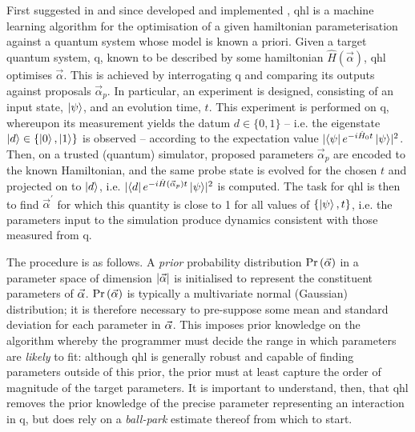 
First suggested in \cite{Granade:2012kj} and since developed \cite{wiebe2014qhlpra, Wiebe:2014qhl} 
    and implemented \cite{wang2017experimental}, 
\gls{qhl} is a machine learning algorithm for the optimisation of a given \gls{hamiltonian} parameterisation 
    against a quantum system whose model is known a priori. 
Given a target quantum system, \gls{q}, known to be described by some \gls{hamiltonian} $\hat{H}(\vec{\alpha})$, 
    \gls{qhl} optimises $\vec{\alpha}$.
This is achieved by interrogating \gls{q} and comparing its outputs against proposals $\vec{\alpha}_p$. 
In particular, an \gls{experiment} is designed, consisting of an input state, $\ket{\psi}$, and an evolution time, $t$.
This \gls{experiment} is performed on \gls{q}, whereupon its measurement yields the datum $d \in \{0, 1\}$ -- 
    i.e. the eigenstate $\ket{d} \in \{ \ket{0}, \ket{1}\}$ is observed -- 
    according to the \gls{expectation value} $\lvert \bra{\psi} e^{-i \hat{H}_0 t} \ket{\psi} \rvert^2$. 
Then, on a trusted (quantum) simulator, proposed parameters $\vec{\alpha}_p$ are encoded to the 
    known Hamiltonian, and the same \gls{probe} state is evolved for the chosen $t$ and projected on to $\ket{d}$, 
    i.e. $\lvert \bra{d} e^{-i \hat{H}(\vec{\alpha}_p) t } \ket{\psi} \rvert^2 $ is computed.
The task for \gls{qhl} is then to find $\vec{\alpha}^{\prime}$ for which this quantity 
    is close to 1 for all values of $\{\ket{\psi}, t\}$, 
    i.e. the parameters input to the simulation produce dynamics consistent with those measured from \gls{q}.

\par 

The procedure is as follows. 
A \emph{prior} probability distribution $\Pr\left(\vec{\alpha}\right)$ in a parameter space of dimension $\lvert \vec{\alpha} \rvert$ 
    is initialised to represent the constituent parameters of $\vec{\alpha}$. 
$\Pr\left(\vec{\alpha}\right)$ is typically a multivariate normal (Gaussian) distribution; 
    it is therefore necessary to pre-suppose some mean and standard deviation for each parameter in $\vec{\alpha}$. 
This imposes prior knowledge on the algorithm whereby the programmer must decide the range in 
    which parameters are \emph{likely} to fit:
    although \gls{qhl} is generally robust and capable of finding parameters outside of this prior,
    the prior must at least capture the order of magnitude of the target parameters. 
It is important to understand, then, that \gls{qhl} removes the prior knowledge 
    of the precise parameter representing an interaction in \gls{q}, but does rely on a \emph{ball-park} estimate thereof from which to start. 
\par 

